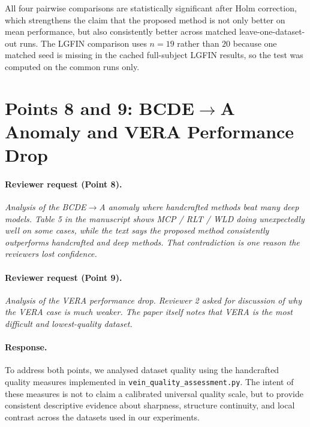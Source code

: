 \documentclass[11pt]{article}
\begin{document}
All four pairwise comparisons are statistically significant after Holm correction, which strengthens the claim that the proposed method is not only better on mean performance, but also consistently better across matched leave-one-dataset-out runs. The LGFIN comparison uses $n=19$ rather than $20$ because one matched seed is missing in the cached full-subject LGFIN results, so the test was computed on the common runs only.

\section*{Points 8 and 9: BCDE$\rightarrow$A Anomaly and VERA Performance Drop}

\paragraph{Reviewer request (Point 8).}
\emph{Analysis of the BCDE$\rightarrow$A anomaly where handcrafted methods beat many deep models. Table 5 in the manuscript shows MCP / RLT / WLD doing unexpectedly well on some cases, while the text says the proposed method consistently outperforms handcrafted and deep methods. That contradiction is one reason the reviewers lost confidence.}

\paragraph{Reviewer request (Point 9).}
\emph{Analysis of the VERA performance drop. Reviewer 2 asked for discussion of why the VERA case is much weaker. The paper itself notes that VERA is the most difficult and lowest-quality dataset.}

\paragraph{Response.}
To address both points, we analysed dataset quality using the handcrafted quality measures implemented in \texttt{vein\_quality\_assessment.py}. The intent of these measures is not to claim a calibrated universal quality scale, but to provide consistent descriptive evidence about sharpness, structure continuity, and local contrast across the datasets used in our experiments.
\end{document}
